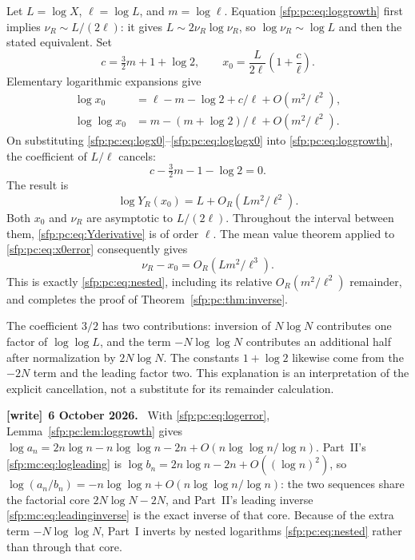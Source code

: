 \documentclass[11pt,letterpaper]{article}
\numberwithin{equation}{section}
\theoremstyle{definition}\newtheorem{definition}[theorem]{Definition}
\theoremstyle{remark}\newtheorem{remark}[theorem]{Remark}
\newenvironment{writenote}[1][]{\par\smallskip\begingroup\small
 \noindent\textbf{[write]}\if\relax\detokenize{#1}\relax\else~\textbf{#1.}\fi\ }%
 {\par\endgroup\smallskip}
\begin{document}
Let $L=\log X$, $\ell=\log L$, and $m=\log\ell$.
Equation \eqref{sfp:pc:eq:loggrowth} first implies
$\nu_R\sim L/(2\ell)$: it gives
$L\sim2\nu_R\log\nu_R$, so
$\log\nu_R\sim\log L$ and then the stated equivalent.
Set
\begin{equation}\label{sfp:pc:eq:x0}
 c=\tfrac32m+1+\log2,
 \qquad x_0=\frac{L}{2\ell}\left(1+\frac c\ell\right).
\end{equation}
Elementary logarithmic expansions give
\begin{align}
 \log x_0&=\ell-m-\log2+c/\ell+O(m^2/\ell^2),
                  \label{sfp:pc:eq:logx0}\\
 \log\log x_0&=m-(m+\log2)/\ell+O(m^2/\ell^2).
                  \label{sfp:pc:eq:loglogx0}
\end{align}
On substituting \eqref{sfp:pc:eq:logx0}--\eqref{sfp:pc:eq:loglogx0} into
\eqref{sfp:pc:eq:loggrowth}, the coefficient of $L/\ell$ cancels:
\[
 c-\tfrac32m-1-\log2=0.
\]
The result is
\begin{equation}\label{sfp:pc:eq:x0error}
 \log Y_R(x_0)=L+O_R(Lm^2/\ell^2).
\end{equation}
Both $x_0$ and $\nu_R$ are asymptotic to $L/(2\ell)$.
Throughout the interval between them, \eqref{sfp:pc:eq:Yderivative}
is of order $\ell$. The mean value theorem applied to
\eqref{sfp:pc:eq:x0error} consequently gives
\[
 \nu_R-x_0=O_R(Lm^2/\ell^3).
\]
This is exactly \eqref{sfp:pc:eq:nested}, including its relative
$O_R(m^2/\ell^2)$ remainder, and completes the proof of
Theorem~\ref{sfp:pc:thm:inverse}.

The coefficient $3/2$ has two contributions: inversion of
$N\log N$ contributes one factor of $\log\log L$, and the
term $-N\log\log N$ contributes an additional half after
normalization by $2N\log N$. The constants $1+\log2$ likewise
come from the $-2N$ term and the leading factor two. This explanation
is an interpretation of the explicit cancellation, not a substitute
for its remainder calculation.
\begin{writenote}[6 October 2026]
With \eqref{sfp:pc:eq:logerror}, Lemma~\ref{sfp:pc:lem:loggrowth} gives $\log a_n=2n\log n-n\log\log n-2n+O(n\log\log n/\log n)$. Part~II's \eqref{sfp:mc:eq:logleading} is $\log b_n=2n\log n-2n+O((\log n)^2)$, so $\log(a_n/b_n)=-n\log\log n+O(n\log\log n/\log n)$: the two sequences share the factorial core $2N\log N-2N$, and Part~II's leading inverse \eqref{sfp:mc:eq:leadinginverse} is the exact inverse of that core. Because of the extra term $-N\log\log N$, Part~I inverts by nested logarithms \eqref{sfp:pc:eq:nested} rather than through that core.
\end{writenote}
\end{document}

